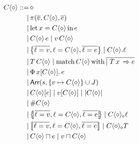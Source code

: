 \begin{align*}
\evalctx ::=&\, 
\ctxhole
\\ \mid&\, 
\pi(\overline{v}, \evalctx, \overline{e})
\\ \mid&\, 
\slet{x}{\evalctx}{e}
\\ \mid&\, 
\evalctx\,e \mid v\,\evalctx
\\ \mid&\, 
\srecordval{\overline{\ell = v}, \ell = \evalctx, \overline{\ell = e}}
\mid 
\evalctx{.}\ell
\\ \mid&\, 
T\,\evalctx
\mid 
\smatch{\evalctx}{\overline{\mid T\,x\,\Rightarrow e}}
\\ \mid&\, 
\sbuild{x}{\evalctx}{e} 
\\ \mid&\, 
\sarrayval{s}{\{ v \mapsto \evalctx \} \cup J}
\\ \mid&\, 
\evalctx\left[ e \right]
\mid
v \left[ \evalctx \right] 
\mid 
\sshape{\evalctx}
\\ \mid&\, 
\# \evalctx
\\ \mid&\, 
\sproductval{\overline{\ell = v}, \ell = \evalctx, \overline{\ell = e}}
\mid
\sproductproj{\evalctx}{\ell} 
\\ \mid&\, 
\sconcatval{\overline{\ell = v}, \ell = \evalctx, \overline{\ell = e}}
\mid 
\sconcatproj{\evalctx}{T}
\\ \mid&\, 
\sbroadcast{\evalctx}{e} \mid \sbroadcast{v}{\evalctx}
\end{align*}